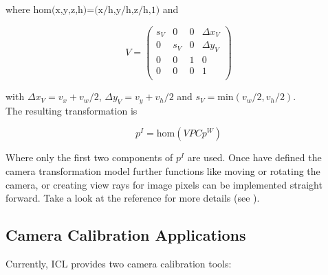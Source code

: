 where $\mbox{hom(x,y,z,h)=(x/h,y/h,z/h,1)}$ and



\begin{equation}
V = \left(\begin{array}{cccc}
  s_V & 0 & 0 & \Delta x_V\\
  0 & s_V & 0 & \Delta y_V\\
  0 & 0 & 1 & 0\\
  0 & 0 & 0 & 1\\
  \end{array}\right)
\end{equation}
 
with $\Delta x_V= v_x+v_w/2$, $\Delta y_V= v_y+v_h/2$ and $s_V = \mbox{min}(v_w/2,v_h/2)$.\\
The resulting transformation is 

\begin{equation}
p^I = \mbox{hom}(V P C p^W)
\end{equation}

Where only the first two components of $p^I$ are used. Once have defined the camera transformation model further functions like moving or rotating the camera, or creating view rays for image pixels can be implemented straight forward. Take a look at the  reference for more details (see ).


\subsection{Camera Calibration Applications\label{subsec:icl-intrinsic-camera-calibration}}

Currently, ICL provides two camera calibration tools:

